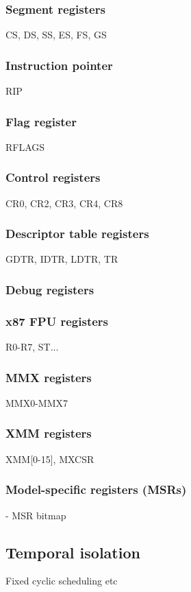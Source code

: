 \subsubsection{Segment registers}
CS, DS, SS, ES, FS, GS

\subsubsection{Instruction pointer}
RIP

\subsubsection{Flag register}
RFLAGS

\subsubsection{Control registers}
CR0, CR2, CR3, CR4, CR8

\subsubsection{Descriptor table registers}
GDTR, IDTR, LDTR, TR

\subsubsection{Debug registers}

\subsubsection{x87 FPU registers}
R0-R7, ST...

\subsubsection{MMX registers}
MMX0-MMX7

\subsubsection{XMM registers}
XMM[0-15], MXCSR

\subsubsection{Model-specific registers (MSRs)}
- MSR bitmap

\subsection{Temporal isolation}
Fixed cyclic scheduling etc

